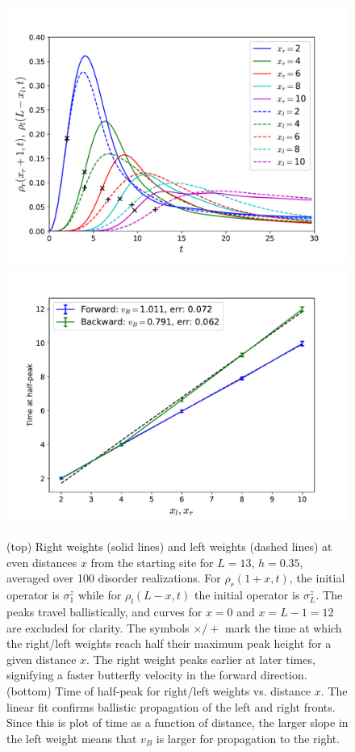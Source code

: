 \documentclass[aps,prx,reprint,superscriptaddress, longbibliography]{revtex4-1}
\begin{document}
\begin{figure}
	\includegraphics[width=\columnwidth]{Rweightpeakshape}
	\includegraphics[width=\columnwidth]{Rweighthalftimes}
	\caption{(top) Right weights (solid lines) and left weights (dashed lines) at even distances $x$ from the starting site for $L=13$, $h=0.35$, averaged over 100 disorder realizations. For $\rho_r(1+x,t)$, the initial operator is $\sigma^z_1$ while for $\rho_l(L-x,t)$ the initial operator is $\sigma^z_{L}$. The peaks travel ballistically, and curves for $x=0$ and $x=L-1=12$ are excluded for clarity. The symbols $\times/+$ mark the time at which the right/left weights reach half their maximum peak height for a given distance $x$. The right weight peaks earlier at later times, signifying a faster butterfly velocity in the forward direction.
		(bottom) Time of half-peak for right/left weights vs. distance $x$. The linear fit confirms ballistic propagation of the left and right fronts. Since this is plot of time as a function of distance, the larger slope in the left weight means that $v_B$ is larger for propagation to the right. 
	}
	\label{fig:Rweightpeakshape}
\end{figure}
\end{document}

